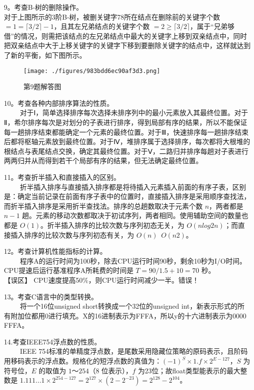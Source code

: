 9。考查B-树的删除操作。\\
对于上图所示的3阶B-树，被删关键字78所在结点在删除前的关键字个数 $=1= \lceil 3/2 \rceil -1$，且其左兄弟结点的关键字个数 $=2 \ge \lceil 3/2 \rceil $，属于“兄弟够借”的情况，则需把该结点的左兄弟结点中最大的关键字上移到双亲结点中，同时把双亲结点中大于上移关键字的关键字下移到要删除关键字的结点中，这样就达到了新的平衡，如下图所示。
\begin{figure}[ht]
\centering
\texttt{[image: ./figures/983bdd6ec90af3d3.png]}
\caption{第9题解答图} \label{fig_CSN12_11}
\end{figure}

10。考查各种内部排序算法的性质。\\
$\qquad$ 对于Ⅰ，简单选择排序每次选择未排序列中的最小元素放入其最终位置。对于Ⅱ，希尔排序每次是对划分的子表进行排序，得到局部有序的结果，所以不能保证每一趟排序结束都能确定一个元素的最终位置。对于Ⅲ，快速排序每一趟排序结束后都将枢轴元素放到最终位置。对于Ⅳ，堆排序属于选择排序，每次都将大根堆的根结点与表尾结点交换，确定其最终位置。对于Ⅴ，二路归并排序每趟对子表进行两两归并从而得到若干个局部有序的结果，但无法确定最终位置。

11。考查折半插入和直接插入的区别。\\
$\qquad$ 折半插入排序与直接插入排序都是将待插入元素插入前面的有序子表，区别是：确定当前记录在前面有序子表中的位置时，直接插入排序是采用顺序查找法，而折半插入排序是采用折半查找法。排序的总趟数取决于元素个数 $n$，两者都是 $n-1$ 趟。元素的移动次数都取决于初试序列，两者相同。使用辅助空间的数量也都是 $O(1)$。折半插入排序的比较次数与序列初态无关，为 $O(nlog2n)$；而直接插入排序的比较次数与序列初态有关，为 $O(n)$~$O(n2)$。

12。考查计算机性能指标的计算。\\
$\qquad$ 程序A的运行时间为100秒，除去CPU运行时间90秒，剩余10秒为I/O时间。CPU提速后运行基准程序A所耗费的时间是 $T=90/1.5+10=70$ 秒。 \\
【误区】 CPU速度提高50\%，则CPU运行时间减少一半。错误！

13。考查C语言中的类型转换。\\
$\qquad$ 将一个16位unsigned short转换成一个32位的unsigned int，新表示形式的所有附加位都用0进行填充。X的16进制表示为FFFA，所以y的十六进制表示为0000 FFFA。

14.考查IEEE754浮点数的性质。\\
$\qquad$ IEEE 754标准的单精度浮点数，是尾数采用隐藏位策略的原码表示，且阶码用移码表示的浮点数。规格化的短浮点数的真值为：$(-1)^S\times1.f\times2^{E-127}$，$S$ 为符号位，$E$ 的取值为 $1$～$254$（$8$ 位表示），$f$ 为23位；故float类型能表示的最大整数是 $1.111...1 \times 2^{254-127}=2^{127} \times (2-2^{-23})=2^{128}-2^{104}$。

